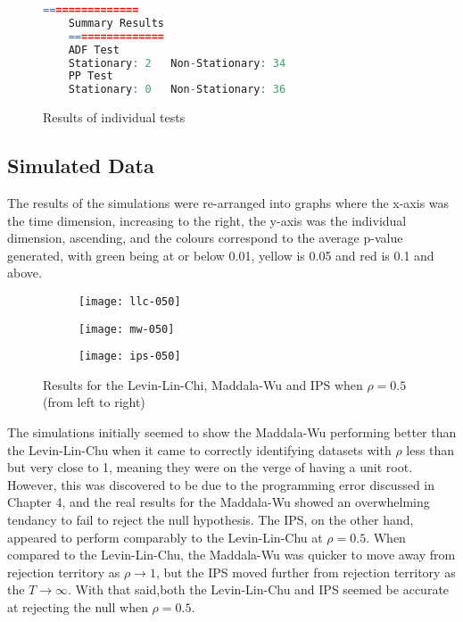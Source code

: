 \begin{figure}[htp]
	\centering
	\begin{lstlisting}[language=R]
	===============
	Summary Results
	===============
	ADF Test
	Stationary: 2   Non-Stationary: 34
	PP Test
	Stationary: 0   Non-Stationary: 36
	\end{lstlisting}
	\caption{Results of individual tests}
\end{figure}



\subsection{Simulated Data}

The results of the simulations were re-arranged into graphs where the x-axis was the time dimension, increasing to the right, the y-axis was the individual dimension, ascending, and the colours correspond to the average p-value generated, with green being at or below 0.01, yellow is 0.05 and red is 0.1 and above.

\begin{figure}[htp]
	\centering
	\begin{subfigure}{0.3\textwidth}
		\centering
		\texttt{[image: llc-050]}
	\end{subfigure}
	\begin{subfigure}{0.3\textwidth}
	\centering
	\texttt{[image: mw-050]}
\end{subfigure}
	\begin{subfigure}{0.3\textwidth}
	\centering
	\texttt{[image: ips-050]}
\end{subfigure}
\caption{Results for the Levin-Lin-Chi, Maddala-Wu and IPS when $\rho = 0.5$ (from left to right)}
\end{figure}

The simulations initially seemed to show the Maddala-Wu performing better than the Levin-Lin-Chu when it came to correctly identifying datasets with $\rho$ less than but very close to 1, meaning they were on the verge of having a unit root. However, this was discovered to be due to the programming error discussed in Chapter 4, and the real results for the Maddala-Wu showed an overwhelming tendancy to fail to reject the null hypothesis. The IPS, on the other hand, appeared to perform comparably to the Levin-Lin-Chu at $\rho = 0.5$. When compared to the Levin-Lin-Chu, the Maddala-Wu was quicker to move away from rejection territory as $\rho \to 1$, but the IPS moved further from rejection territory as the $T \to \infty$. With that said,both the Levin-Lin-Chu and IPS seemed be accurate at rejecting the null when $\rho = 0.5$.

